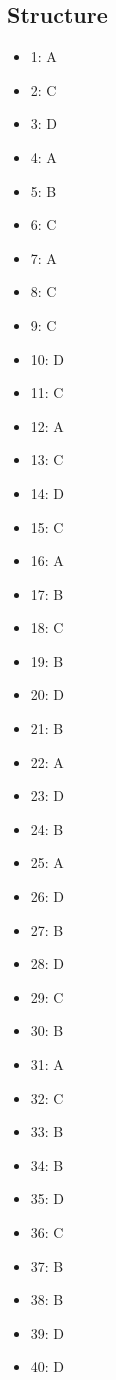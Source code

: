 \documentclass[12pt]{article}
\begin{document}
\subsection*{Structure}
\begin{itemize}[leftmargin=*]
\item 1: A
\item 2: C
\item 3: D
\item 4: A
\item 5: B
\item 6: C
\item 7: A
\item 8: C
\item 9: C
\item 10: D
\item 11: C
\item 12: A
\item 13: C
\item 14: D
\item 15: C
\item 16: A
\item 17: B
\item 18: C
\item 19: B
\item 20: D
\item 21: B
\item 22: A
\item 23: D
\item 24: B
\item 25: A
\item 26: D
\item 27: B
\item 28: D
\item 29: C
\item 30: B
\item 31: A
\item 32: C
\item 33: B
\item 34: B
\item 35: D
\item 36: C
\item 37: B
\item 38: B
\item 39: D
\item 40: D
\end{itemize}
\end{document}
